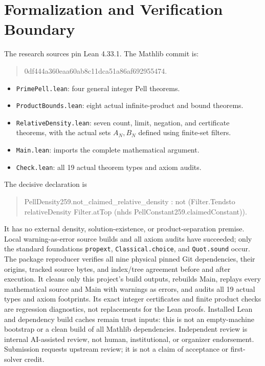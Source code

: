 \documentclass[11pt]{article}
\begin{document}
\section{Formalization and Verification Boundary}
The research sources pin Lean 4.33.1. The Mathlib commit is:
\begin{quote}\small\ttfamily
0df444a360eaa60ab8c11dca51a86af692955474.
\end{quote}
\begin{itemize}
\item \texttt{PrimePell.lean}: four general integer Pell theorems.
\item \texttt{ProductBounds.lean}: eight actual infinite-product and bound theorems.
\item \texttt{RelativeDensity.lean}: seven count, limit, negation, and certificate
  theorems, with the actual sets $A_N,B_N$ defined using finite-set filters.
\item \texttt{Main.lean}: imports the complete mathematical argument.
\item \texttt{Check.lean}: all 19 actual theorem types and axiom audits.
\end{itemize}
The decisive declaration is
\begin{quote}\small\ttfamily
PellDensity259.not\_claimed\_relative\_density :\newline
\phantom{xx}not (Filter.Tendsto relativeDensity Filter.atTop\newline
\phantom{xxxx}(nhds PellConstant259.claimedConstant)).
\end{quote}
It has no external density, solution-existence, or product-separation premise.
Local warning-as-error source builds and all axiom audits have succeeded; only
the standard foundations \texttt{propext}, \texttt{Classical.choice}, and
\texttt{Quot.sound} occur. The package reproducer verifies all nine physical
pinned Git dependencies, their origins, tracked source bytes, and index/tree
agreement before and after execution. It cleans only this project's build
outputs, rebuilds Main, replays every mathematical source and Main with warnings
as errors, and audits all 19 actual types and axiom footprints. Its exact integer
certificates and finite product checks are regression diagnostics, not replacements
for the Lean proofs. Installed Lean and dependency build caches remain trust
inputs: this is not an empty-machine bootstrap or a clean build of all Mathlib
dependencies. Independent review is internal AI-assisted review, not human,
institutional, or organizer endorsement. Submission requests upstream review;
it is not a claim of acceptance or first-solver credit.
\end{document}
